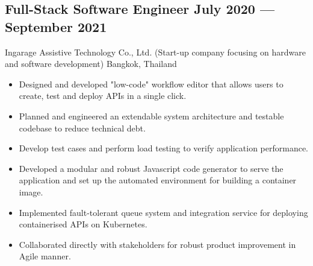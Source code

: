 \documentclass{article}
\newcommand{\subtext}[1]{
#1\par\vspace{-0.2cm}}
\newenvironment{zitemize}{
\begin{itemize}\itemsep0pt \parskip0pt \parsep1pt}
{\end{itemize}\vspace{-0.5cm}}
\begin{document}
        \subsection*{Full-Stack Software Engineer \hfill July 2020 --- September 2021} 
        \subtext{Ingarage Assistive Technology Co., Ltd. {\scriptsize (Start-up company focusing on hardware and software development)} \hfill Bangkok, Thailand} 
            \vspace{0.05cm}
            \begin{zitemize}
                \item Designed and developed "low-code" workflow editor that allows users to create, test and deploy APIs in a single click.
                \item Planned and engineered an extendable system architecture and testable codebase to reduce technical debt.
                \item Develop test cases and perform load testing to verify application performance.
                \item Developed a modular and robust Javascript code generator to serve the application and set up the automated environment for building a container image.
                \item Implemented fault-tolerant queue system and integration service for deploying containerised APIs on Kubernetes.
                \item Collaborated directly with stakeholders for robust product improvement in Agile manner.
            \end{zitemize}

        \vspace{0.2cm}
    
\end{document}

